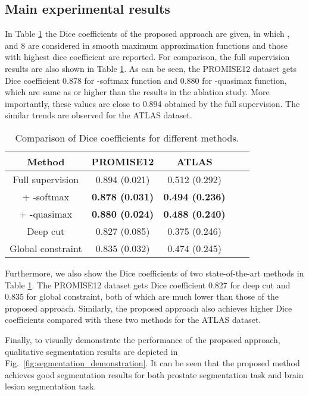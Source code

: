 \documentclass[runningheads]{llncs}
\begin{document}
\subsection{Main experimental results}
In Table \ref{table:main_results} the Dice coefficients of the proposed approach are given, in which , and 8 are considered in smooth maximum approximation functions and those with highest dice coefficient are reported. For comparison, the full supervision results are also shown in Table \ref{table:main_results}. As can be seen, the PROMISE12 dataset gets Dice coefficient 0.878 for -softmax function and 0.880 for -quasimax function, which are same as or higher than the results in the ablation study. More importantly, these values are close to 0.894 obtained by the full supervision. The similar trends are observed for the ATLAS dataset.


\renewcommand\arraystretch{1.3}
\begin{table}
\caption{Comparison of Dice coefficients for different methods.}
\centering
\label{table}
\setlength{\tabcolsep}{5pt}
\begin{tabular}{ccccc}
\hline
\hline
Method & PROMISE12 & ATLAS \\
\hline
Full supervision & 0.894 (0.021) & 0.512 (0.292) \\
 + -softmax & \textbf{0.878 (0.031)} & \textbf{0.494 (0.236)} \\
 + -quasimax & \textbf{0.880 (0.024)} & \textbf{0.488 (0.240)} \\
Deep cut \cite{rajchl2016deepcut} & 0.827 (0.085) & 0.375 (0.246) \\
Global constraint \cite{kervadec2020bounding} & 0.835 (0.032) & 0.474 (0.245) \\
\hline
\hline
\end{tabular}
\label{table:main_results}
\end{table}

Furthermore, we also show the Dice coefficients of two state-of-the-art methods in Table \ref{table:main_results}. The PROMISE12 dataset gets Dice coefficient 0.827 for deep cut and 0.835 for global constraint, both of which are much lower than those of the proposed approach. Similarly, the proposed approach also achieves higher Dice coefficients compared with these two methods for the ATLAS dataset. 

Finally, to visually demonstrate the performance of the proposed approach, qualitative segmentation results are depicted in Fig.~\ref{fig:segmentation_demonstration}. It can be seen that the proposed method achieves good segmentation results for both prostate segmentation task and brain lesion segmentation task.
\end{document}
